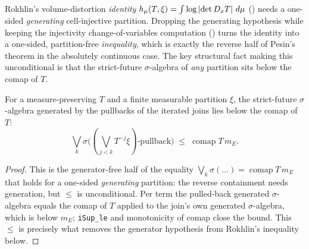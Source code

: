 Rokhlin's volume-distortion \emph{identity} \(h_\mu(T,\xi)=\int\log\left\lvert \det D_xT \right\rvert\,d\mu\)
() needs a one-sided \emph{generating}
cell-injective partition. Dropping the generating hypothesis while keeping the injectivity
change-of-variables computation () turns the
identity into a one-sided, partition-free \emph{inequality}, which is exactly the reverse half of
Pesin's theorem in the absolutely continuous case. The key structural fact making this
unconditional is that the strict-future \(\sigma\)-algebra of \emph{any} partition sits below the
comap of \(T\).

\begin{lemma}\label{strictFuture_le_comap}
  \leanok
  For a measure-preserving \(T\) and a finite measurable partition \(\xi\), the strict-future
  \(\sigma\)-algebra generated by the pullbacks of the iterated joins lies below the comap of
  \(T\):
  \[
    \bigvee_{k}\sigma\bigl((\textstyle\bigvee_{j<k}T^{-j}\xi)\text{-pullback}\bigr)
      \;\le\; \operatorname{comap}T\,m_E .
  \]
\end{lemma}
\begin{proof}\leanok
  This is the generator-free half of the equality
  \(\bigvee_k\sigma(\dots)=\operatorname{comap}T\,m_E\) that holds for a one-sided
  \emph{generating} partition: the reverse containment needs generation, but \(\le\) is
  unconditional. Per term the pulled-back generated \(\sigma\)-algebra equals the comap of \(T\)
  applied to the join's own generated \(\sigma\)-algebra, which is below \(m_E\); \texttt{iSup\_le}
  and monotonicity of comap close the bound. This \(\le\) is precisely what removes the generator
  hypothesis from Rokhlin's inequality below.
\end{proof}

